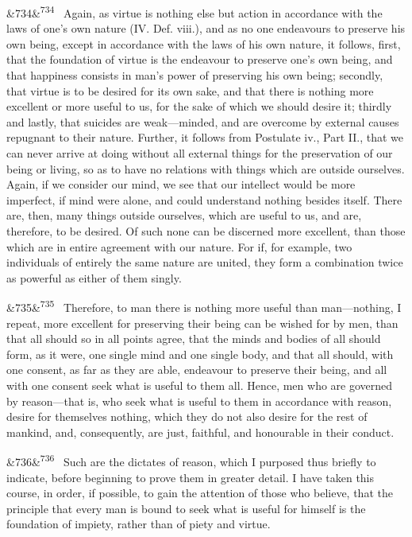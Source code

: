 \documentclass[12pt]{article}
\newcommand{\para}[1][]{\par\noindent\ifx&#1&\else\textsuperscript{\footnotesize #1}~\fi}
\begin{document}
\para[734] Again, as virtue is nothing else but action in accordance with the laws of one's own nature (IV. Def. viii.), and as no one endeavours to preserve his own being, except in accordance with the laws of his own nature, it follows, first, that the foundation of virtue is the endeavour to preserve one's own being, and that happiness consists in man's power of preserving his own being; secondly, that virtue is to be desired for its own sake, and that there is nothing more excellent or more useful to us, for the sake of which we should desire it; thirdly and lastly, that suicides are weak---minded, and are overcome by external causes repugnant to their nature. Further, it follows from Postulate iv., Part II., that we can never arrive at doing without all external things for the preservation of our being or living, so as to have no relations with things which are outside ourselves. Again, if we consider our mind, we see that our intellect would be more imperfect, if mind were alone, and could understand nothing besides itself. There are, then, many things outside ourselves, which are useful to us, and are, therefore, to be desired. Of such none can be discerned more excellent, than those which are in entire agreement with our nature. For if, for example, two individuals of entirely the same nature are united, they form a combination twice as powerful as either of them singly.

\para[735] Therefore, to man there is nothing more useful than man---nothing, I repeat, more excellent for preserving their being can be wished for by men, than that all should so in all points agree, that the minds and bodies of all should form, as it were, one single mind and one single body, and that all should, with one consent, as far as they are able, endeavour to preserve their being, and all with one consent seek what is useful to them all. Hence, men who are governed by reason---that is, who seek what is useful to them in accordance with reason, desire for themselves nothing, which they do not also desire for the rest of mankind, and, consequently, are just, faithful, and honourable in their conduct.

\para[736] Such are the dictates of reason, which I purposed thus briefly to indicate, before beginning to prove them in greater detail. I have taken this course, in order, if possible, to gain the attention of those who believe, that the principle that every man is bound to seek what is useful for himself is the foundation of impiety, rather than of piety and virtue.
\end{document}
